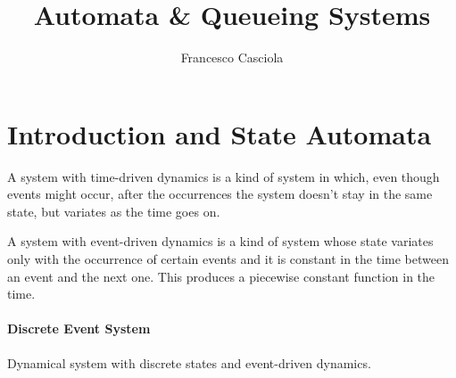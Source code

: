 \documentclass[12pt,a4paper]{article}
\title{Automata \& Queueing Systems}
\author{Francesco Casciola}
\begin{document}
\maketitle
\tableofcontents
\newpage
\section{Introduction and State Automata}
\label{sec:Int}
A system with time-driven dynamics is a kind of system in which, even though events might occur, after the occurrences the system doesn’t stay in the same state, but variates as the time goes on.

\bigskip
\noindent
A system with event-driven dynamics is a kind of system whose state variates only with the occurrence of certain events and it is constant in the time between an event and the next one. This produces a piecewise constant function in the time.

\paragraph{Discrete Event System} Dynamical system with discrete states and event-driven dynamics.
\end{document}

